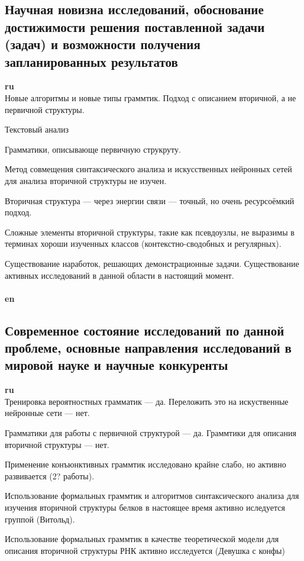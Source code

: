 \documentclass[12pt]{article}  %
\theoremstyle{remark}
\begin{document}
\subsection{Научная новизна исследований, обоснование достижимости решения поставленной задачи (задач) и возможности получения запланированных результатов}

\textbf{ru}\\
Новые алгоритмы и новые типы граммтик.
Подход с описанием вторичной, а не первичной структуры.

Текстовый анализ

Грамматики, описывающе первичную струкруту.

Метод совмещения синтаксического анализа и искусственных нейронных сетей для анализа вторичной структуры не изучен.

Вторичная структура --- через энергии связи --- точный, но очень ресурсоёмкий подход.

Сложные элементы вторичной структуры, такие как псевдоузлы, не выразимы в терминах хороши изученных классов (контекстно-сводобных и регулярных).

Существование наработок, решающих демонстрационные задачи.
Существование активных исследований в данной области в настоящий момент.
\\
\\
\textbf{en}\\


\subsection{Современное состояние исследований по данной проблеме, основные направления исследований в мировой науке и научные конкуренты}

\textbf{ru}\\
Тренировка вероятностных грамматик --- да.
Переложить это на искуственные нейронные сети --- нет.

Грамматики для работы с первичной структурой --- да.
Граммтики для описания вторичной структуры --- нет.

Применение конъюнктивных граммтик исследовано крайне слабо, но активно развивается (2? работы).

Использование формальных граммтик и алгоритмов синтаксического анализа для изучения вторичной структуры белков в настоящее время активно иследуется группой (Витольд).

Использование формальных граммтик в качестве теоретической модели для описания вторичной структуры РНК активно исследуется (Девушка с конфы)
\end{document}
